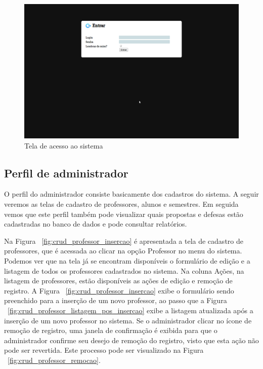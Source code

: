 \begin{figure}[htbp]
\centering
\includegraphics[width=1\textwidth]{fig/telas/login.png}
\caption{Tela de acesso ao sistema}
\label{fig:tela_login}
\end{figure}



\subsection{Perfil de administrador}
O perfil do administrador consiste basicamente dos cadastros do sistema. A seguir veremos as
telas de cadastro de professores, alunos e semestres. Em seguida vemos que este perfil também
pode visualizar quais propostas e defesas estão cadastradas no banco de dados e pode 
consultar relatórios.

Na Figura ~\ref{fig:crud_professor_insercao} é apresentada a tela de cadastro de professores, que
é acessada ao clicar na opção Professor no menu do sistema. Podemos ver que na tela
já se encontram disponíveis o formulário de edição e a listagem de todos os professores cadastrados 
no sistema. Na coluna Ações, na listagem de professores, estão disponíveis as ações de edição
e remoção de registro. A Figura ~\ref{fig:crud_professor_insercao} exibe o formulário sendo preenchido
para a inserção de um novo professor, ao passo que a Figura ~\ref{fig:crud_professor_listagem_pos_insercao}
exibe a listagem atualizada após a inserção de um novo professor no sistema. Se o administrador 
clicar no ícone de remoção de registro, uma janela de confirmação é exibida para que
o administrador confirme seu desejo de remoção do registro, visto que esta ação não pode
ser revertida. Este processo pode ser visualizado na Figura ~\ref{fig:crud_professor_remocao}.

